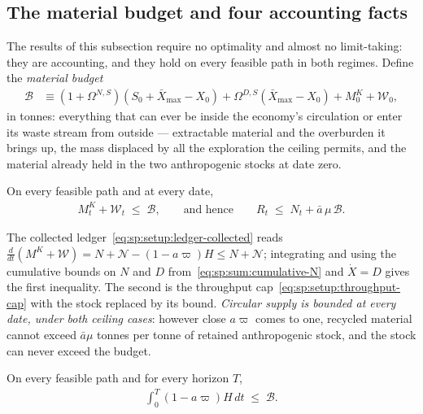 \subsection{The material budget and four accounting facts}\label{sec:sp:longrun:budget}

The results of this subsection require no optimality and almost no limit-taking: they are accounting, and they hold on every feasible path in both regimes. Define the \emph{material budget}
\begin{align}
\mathcal B &\equiv \left(1+\Omega^{N,S}\right)\left(S_0+\bar X_{\max}-X_0\right)+\Omega^{D,S}\left(\bar X_{\max}-X_0\right)+M^K_0+\mathcal W_0,
\label{eq:sp:lr:budget}
\end{align}
in tonnes: everything that can ever be inside the economy's circulation or enter its waste stream from outside --- extractable material and the overburden it brings up, the mass displaced by all the exploration the ceiling permits, and the material already held in the two anthropogenic stocks at date zero.

\begin{lemma}\label{lem:lr:stocks}
On every feasible path and at every date,
\begin{align}
M^K_t+\mathcal W_t \;\le\; \mathcal B,
\qquad\text{and hence}\qquad
R_t \;\le\; N_t+\bar a\,\mu\,\mathcal B .
\label{eq:sp:lr:stockbound}
\end{align}
\end{lemma}

The collected ledger~\eqref{eq:sp:setup:ledger-collected} reads $\frac{d}{dt}\left(M^K+\mathcal W\right)=N+\mathcal N-\left(1-a\varpi\right)H\le N+\mathcal N$; integrating and using the cumulative bounds on $N$ and $D$ from~\eqref{eq:sp:sum:cumulative-N} and $\dot X=D$ gives the first inequality. The second is the throughput cap~\eqref{eq:sp:setup:throughput-cap} with the stock replaced by its bound. \emph{Circular supply is bounded at every date, under both ceiling cases}: however close $a\varpi$ comes to one, recycled material cannot exceed $\bar a\mu$ tonnes per tonne of retained anthropogenic stock, and the stock can never exceed the budget.

\begin{lemma}\label{lem:lr:leakage}
On every feasible path and for every horizon $T$,
\begin{align}
\int_0^T \left(1-a\varpi\right)H\,dt \;\le\; \mathcal B .
\label{eq:sp:lr:leakage}
\end{align}
\end{lemma}

